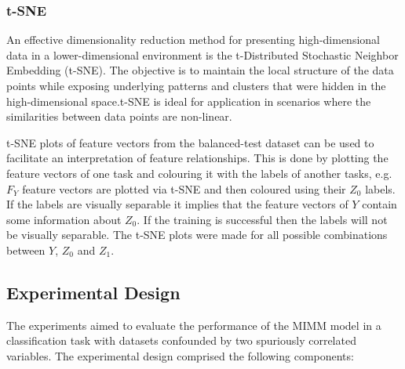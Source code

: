 \documentclass[12pt,DIV14,BCOR12mm,a4paper,footinclude=false,headinclude,parskip=half-,twoside,openright,cleardoublepage=empty,toc=index,bibliography=totoc,listof=totoc]{scrreprt}
\numberwithin{equation}{chapter}
\begin{document}
\subsubsection{t-SNE}
An effective dimensionality reduction method for presenting high-dimensional data in a lower-dimensional environment is the t-Distributed Stochastic Neighbor Embedding (t-SNE). The objective is to maintain the local structure of the data points while exposing underlying patterns and clusters that were hidden in the high-dimensional space.t-SNE is ideal for application in scenarios where the similarities between data points are non-linear.

t-SNE plots of feature vectors from the balanced-test dataset can be used to facilitate an interpretation of feature relationships. This is done by plotting the feature vectors of one task and colouring it with the labels of another tasks, e.g. $F_Y$ feature vectors are plotted via t-SNE and then coloured using their $Z_0$ labels. If the labels are visually separable it implies that the feature vectors of $Y$ contain some information about $Z_0$. If the training is successful then the labels will not be visually separable. The t-SNE plots were made for all possible combinations between $Y$, $Z_0$ and $Z_1$. 

\subsection{Experimental Design}\label{sec:3.2.5}

The experiments aimed to evaluate the performance of the MIMM model in a classification task with datasets confounded by two spuriously correlated variables. The experimental design comprised the following components:
\end{document}
